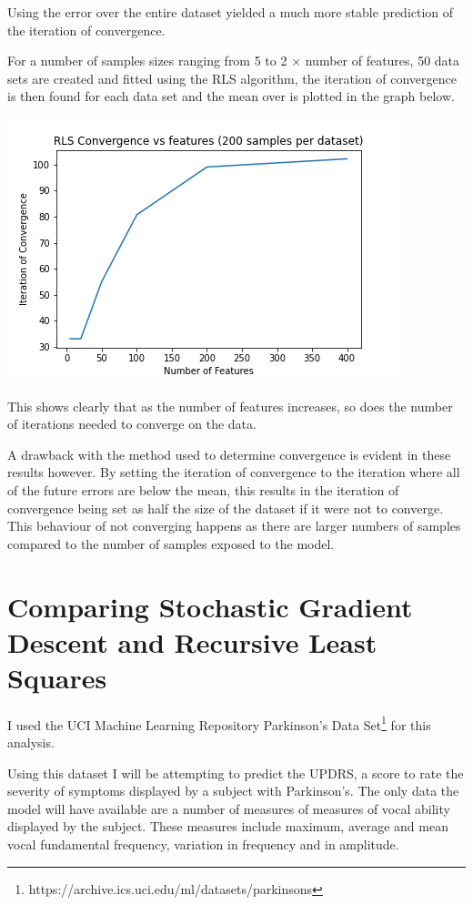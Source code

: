 \documentclass[sigconf]{acmart}
\begin{document}
Using the error over the entire dataset yielded a much more stable prediction of the iteration of convergence.

For a number of samples sizes ranging from 5 to 2 $\times$ number of features, 50 data sets are created and fitted using the RLS algorithm, the iteration of convergence is then found for each data set and the mean over is plotted in the graph below.

\begin{center}
    \includegraphics[width=\linewidth]{figs/RLSConvergence.png}
\end{center}
This shows clearly that as the number of features increases, so does the number of iterations needed to converge on the data.

A drawback with the method used to determine convergence is evident in these results however. By setting the iteration of convergence to the iteration where all of the future errors are below the mean, this results in the iteration of convergence being set as half the size of the dataset if it were not to converge. 
This behaviour of not converging happens as there are larger numbers of samples compared to the number of samples exposed to the model.  

\section{Comparing Stochastic Gradient Descent and Recursive Least Squares}

I used the UCI Machine Learning Repository Parkinson's Data Set\footnote{https://archive.ics.uci.edu/ml/datasets/parkinsons} for this analysis.

Using this dataset I will be attempting to predict the UPDRS, a score to rate the severity of symptoms displayed by a subject with Parkinson's. The only data the model will have available are a number of measures of measures of vocal ability displayed by the subject. These measures include maximum, average and mean vocal fundamental frequency, variation in frequency and in amplitude.
\end{document}
